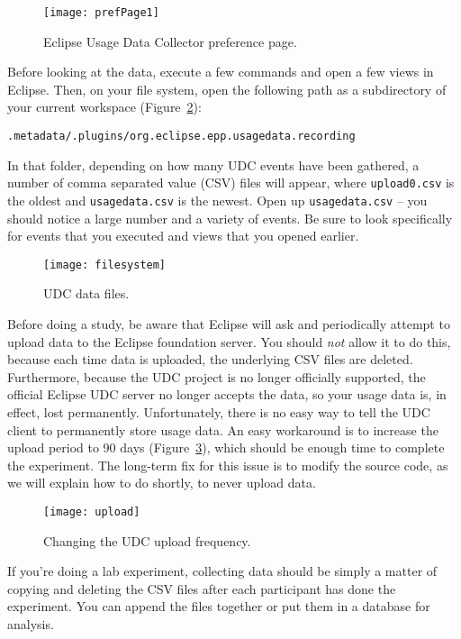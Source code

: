 \begin{figure}
  \centering
  \texttt{[image: prefPage1]}
  \caption{Eclipse Usage Data Collector preference page.}\label{fig:prefPage1}
\end{figure}

Before looking at the data, execute a few commands and open a few views
in Eclipse.
Then, on your file system, open the following path as a subdirectory
of your current workspace (Figure~\ref{fig:filesystem}):

\vspace{4mm}
\texttt{.metadata/.plugins/org.eclipse.epp.usagedata.recording}
\vspace{4mm}

\noindent
In that folder, depending on how many UDC events have been gathered,
a number of comma separated value (CSV) files will appear, where \texttt{upload0.csv} is the oldest
and \texttt{usagedata.csv} is the newest.
Open up \texttt{usagedata.csv} -- you should notice a large number and a variety of events.
Be sure to look specifically for events that you executed and views that you opened earlier.

\begin{figure}
  \centering
  \texttt{[image: filesystem]}
  \caption{UDC data files.}\label{fig:filesystem}
\end{figure}

Before doing a study, be aware that Eclipse will ask and periodically attempt to upload
data to the Eclipse foundation server.
You should \emph{not} allow it to do this, because each time data is uploaded, the underlying
CSV files are deleted.
Furthermore, because the UDC project is no longer officially supported, the official Eclipse
UDC server no longer accepts the data, so your usage data is, in effect, lost permanently.
Unfortunately, there is no easy way to tell the UDC client to permanently store
usage data.
An easy workaround is to increase the upload period to 90 days (Figure~\ref{fig:upload}),
which should be enough time to complete the experiment.
The long-term fix for this issue is to modify the source code, as we will explain
how to do shortly, to never upload data.

\begin{figure}
  \centering
  \texttt{[image: upload]}
  \caption{Changing the UDC upload frequency.}\label{fig:upload}
\end{figure}

If you're doing a lab experiment, collecting data should be simply a matter of
copying and deleting the CSV files after each participant has done the experiment.
You can append the files together or put them in a database for analysis.

